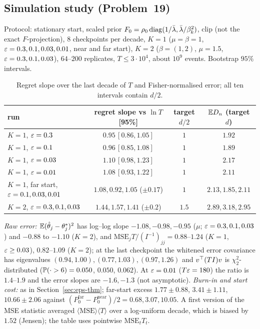 \subsection{Simulation study (Problem~19)}\label{sec:sim}
Protocol: stationary start, scaled prior $F_0=\rho_0\operatorname{diag}(1/\lbar,\lbar/\beta_k^2)$, clip (not the exact $F$-projection), $8$ checkpoints per decade, $K=1$ ($\mu=\beta=1$, $\eps=0.3,0.1,0.03,0.01$, near and far start), $K=2$ ($\beta=(1,2)$, $\mu=1.5$, $\eps=0.3,0.1,0.03$), $64$--$200$ replicates, $T\le3\cdot10^4$, about $10^9$ events. Bootstrap $95\%$ intervals.

\begin{table}[h]\centering\small
\begin{tabular}{@{}lccc@{}}\toprule
run & regret slope vs $\ln T$ [95\%] & target $d/2$ & $\E D_n$ (target $d$)\\\midrule
$K=1$, $\eps=0.3$ & $0.95\,[0.86,1.05]$ & $1$ & $1.92$\\
$K=1$, $\eps=0.1$ & $0.96\,[0.85,1.08]$ & $1$ & $1.89$\\
$K=1$, $\eps=0.03$ & $1.10\,[0.98,1.23]$ & $1$ & $2.17$\\
$K=1$, $\eps=0.01$ & $1.08\,[0.93,1.22]$ & $1$ & $2.11$\\
$K=1$, far start, $\eps=0.1,0.03,0.01$ & $1.08,0.92,1.05$ ($\pm0.17$) & $1$ & $2.13,1.85,2.11$\\
$K=2$, $\eps=0.3,0.1,0.03$ & $1.44,1.57,1.41$ ($\pm0.2$) & $1.5$ & $2.89,3.18,2.95$\\\bottomrule
\end{tabular}
\caption{Regret slope over the last decade of $T$ and Fisher-normalised error; all ten intervals contain $d/2$.}\label{tab:sim}
\end{table}
\emph{Raw error:} $\E(\hat\theta_j-\theta^*_j)^2$ has log--log slope $-1.08,-0.98,-0.95$ ($\mu$; $\eps=0.3,0.1,0.03$) and $-0.88$ to $-1.10$ ($K=2$), and $\mathrm{MSE}_jT/(I^{-1})_{jj}=0.88$--$1.24$ ($K=1$, $\eps\ge0.03$), $0.82$--$1.09$ ($K=2$); at the last checkpoint the whitened error covariance has eigenvalues $(0.94,1.00),(0.77,1.03),(0.97,1.26)$ and $v\T(TI)v$ is $\chi^2_2$-distributed ($\P(\cdot>6)=0.050$, $0.050$, $0.062$). At $\eps=0.01$ ($T\eps=180$) the ratio is $1.4$--$1.9$ and the error slopes are $-1.6,-1.3$ (not asymptotic). \emph{Burn-in and start cost:} as in Section~\ref{sec:eps-thm}; far-start excess $1.77\pm0.88$, $3.41\pm1.11$, $10.66\pm2.06$ against $(P_0^{\mathrm{far}}-P_0^{\mathrm{near}})/2=0.68,3.07,10.05$. A first version of the MSE statistic averaged $\langle\mathrm{MSE}\rangle\langle T\rangle$ over a log-uniform decade, which is biased by $1.52$ (Jensen); the table uses pointwise $\mathrm{MSE}_tT_t$.

